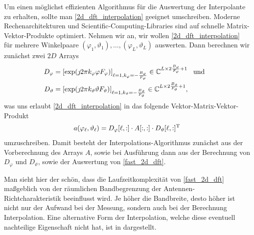 Um einen m\"oglichst effizienten Algorithmus f\"ur die Auswertung der Interpolante zu erhalten, sollte man \eqref{2d_dft_interpolation} geeignet umschreiben.
Moderne Rechenarchitekturen und Scientific-Computing-Libraries sind auf schnelle Matrix-Vektor-Produkte optimiert.
Nehmen wir an, wir wollen \eqref{2d_dft_interpolation} f\"ur mehrere Winkelpaare $(\varphi_1, \vartheta_1), \dots, (\varphi_L, \vartheta_L)$ auswerten.
Dann berechnen wir zun\"achst zwei $2D$ Arrays
\begin{align}
    D_\varphi &= [\exp(\jmath 2 \pi k_\varphi \varphi F_\varphi)]_{\ell = 1, k_\varphi=-\frac{B_\varphi}{F_\varphi}} \in \mathbb{C}^{L \times 2 \frac{B_\varphi}{F_\varphi} + 1} {\hspace{3mm} \text{und} \hspace{3mm}}\\
    D_\vartheta &= [\exp(\jmath 2 \pi k_\vartheta \vartheta F_\vartheta)]_{\ell = 1, k_\vartheta=-\frac{B_\vartheta}{F_\vartheta}} \in \mathbb{C}^{L \times 2 \frac{B_\vartheta}{F_\vartheta} + 1}, 
\end{align}
was uns erlaubt \eqref{2d_dft_interpolation} in das folgende Vektor-Matrix-Vektor-Produkt
\begin{equation}\label{fast_2d_dft}
    a(\varphi_\ell, \vartheta_\ell) = 
        D_\varphi[\ell, :] \cdot A[:,:] \cdot D_\vartheta[\ell, :]^{\mathrm{T}}
\end{equation}
umzuschreiben.
Damit besteht der Interpolations-Algorithmus zun\"achst aus der Vorberechnung des Arrays $A$, sowie bei Ausf\"uhrung dann aus der Berechnung von $D_\varphi$ und $D_\vartheta$, sowie der Auswertung von \eqref{fast_2d_dft}.

Man sieht hier der sch\"on, dass die Laufzeitkomplexit\"at von \eqref{fast_2d_dft} ma{\ss}geblich von der r\"aumlichen Bandbegrenzung der Antennen-Richtcharakteristik beeinflusst wird.
Je h\"oher die Bandbreite, desto h\"oher ist nicht nur der Aufwand bei der Messung, sondern auch bei der Berechnung Interpolation.
Eine alternative Form der Interpolation, welche diese eventuell nachteilige Eigenschaft nicht hat, ist in  dargestellt.
